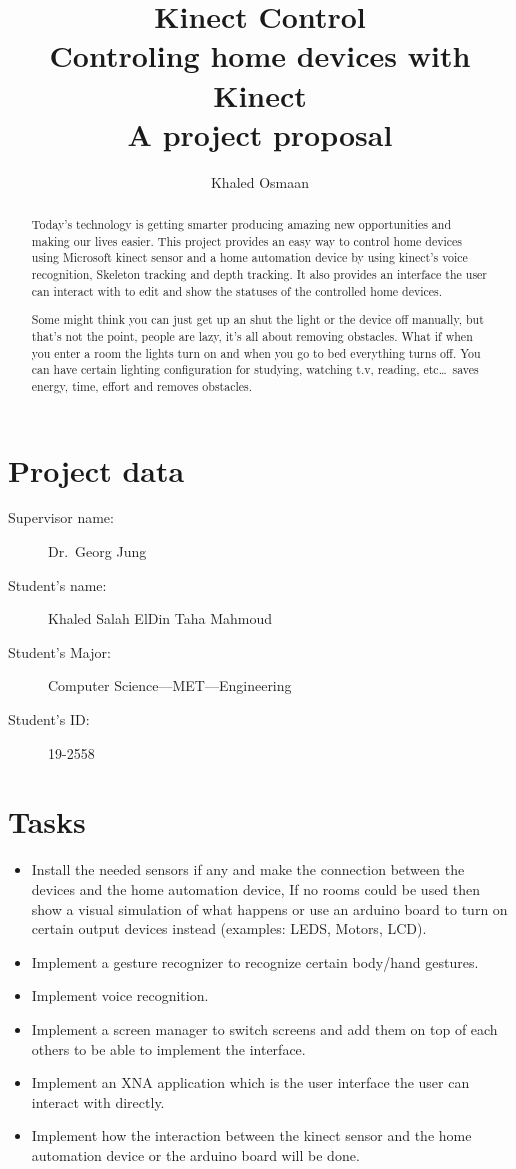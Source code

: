 \documentclass[a4paper]{article}
\author{Khaled Osmaan}
\title{Kinect Control\\{\smaller Controling home devices with
    Kinect\\{\smaller A project proposal}}}
\begin{document}
\maketitle

\begin{abstract}
  Today's technology is getting smarter producing amazing new
  opportunities and making our lives easier. This project provides an
  easy way to control home devices using Microsoft kinect sensor and a
  home automation device by using kinect's voice recognition, Skeleton
  tracking and depth tracking. It also provides an interface the user
  can interact with to edit and show the statuses of the controlled
  home devices.

  Some might think you can just get up an shut the light or the device
  off manually, but that's not the point, people are lazy, it's all
  about removing obstacles. What if when you enter a room the lights
  turn on and when you go to bed everything turns off. You can have
  certain lighting configuration for studying, watching t.v, reading,
  etc\ldots\ saves energy, time, effort and removes obstacles.
\end{abstract}

\section*{Project data}

\begin{description}
\item[Supervisor name:] Dr.\ Georg Jung
\item[Student's name:] Khaled Salah ElDin Taha Mahmoud
\item[Student's Major:] Computer Science---MET---Engineering
\item[Student's ID:] 19-2558
\end{description}

\section*{Tasks}
\begin{itemize}
\item Install the needed sensors if any and make the connection
  between the devices and the home automation device, If no rooms
  could be used then show a visual simulation of what happens or use
  an arduino board to turn on certain output devices instead
  (examples: LEDS, Motors, LCD).
\item Implement a gesture recognizer to recognize certain body/hand
  gestures.
\item Implement voice recognition.
\item Implement a screen manager to switch screens and add them on top
  of each others to be able to implement the interface.
\item Implement an XNA application which is the user interface the
  user can interact with directly.
\item Implement how the interaction between the kinect sensor and the
  home automation device or the arduino board will be done.
\end{itemize}
\end{document}
